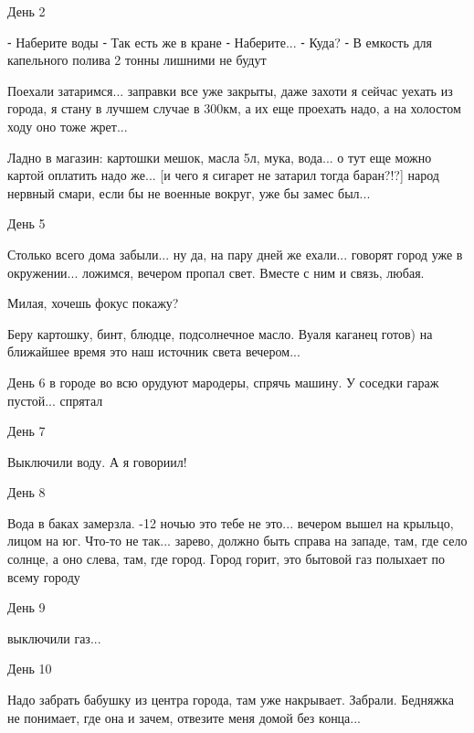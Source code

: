 
День 2

⁃ Наберите воды
⁃ Так есть же в кране
⁃ Наберите...
⁃ Куда?
⁃ В емкость для капельного полива 2 тонны лишними не будут

Поехали затаримся... заправки все уже закрыты, даже захоти я сейчас уехать из
города, я стану в лучшем случае в 300км, а их еще проехать надо, а на холостом
ходу оно тоже жрет...

Ладно в магазин: картошки мешок, масла 5л, мука, вода... о тут еще можно картой
оплатить надо же... [и чего я сигарет не затарил тогда баран?!?] народ нервный
смари, если бы не военные вокруг, уже бы замес был...


День 5

Столько всего дома забыли... ну да, на пару дней же ехали... говорят город уже в
окружении... ложимся, вечером пропал свет. Вместе с ним и связь, любая. 

Милая, хочешь фокус покажу?

Беру картошку, бинт, блюдце, подсолнечное масло. Вуаля каганец готов) на ближайшее время это наш источник света вечером...

День 6 в городе во всю орудуют мародеры, спрячь машину. У соседки гараж пустой... спрятал

День 7

Выключили воду. А я говориил!

День 8

Вода в баках замерзла. -12 ночью это тебе не это... вечером вышел на крыльцо,
лицом на юг. Что-то не так... зарево, должно быть справа на западе, там, где село
солнце, а оно слева, там, где город. Город горит, это бытовой газ полыхает по
всему городу


День 9

выключили газ...

День 10

Надо забрать бабушку из центра города, там уже накрывает. Забрали. Бедняжка не
понимает, где она и зачем, отвезите меня домой без конца...

